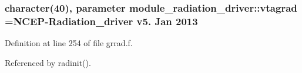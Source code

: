 \subsubsection[{\texorpdfstring{vtagrad}{vtagrad}}]{\setlength{\rightskip}{0pt plus 5cm}character(40), parameter module\+\_\+radiation\+\_\+driver\+::vtagrad =\textquotesingle{}N\+C\+EP-\/Radiation\+\_\+driver v5. Jan 2013 \textquotesingle{}\hspace{0.3cm}{\ttfamily [private]}}\hypertarget{namespacemodule__radiation__driver_a70a36595385cf1f5794f9c5859e52ab6}{}\label{namespacemodule__radiation__driver_a70a36595385cf1f5794f9c5859e52ab6}


Definition at line 254 of file grrad.\+f.



Referenced by radinit().

